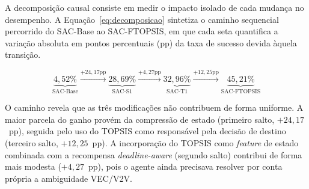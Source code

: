\begin{table}[htb]
\centering
\caption{Resultados das variantes do estudo de ablação avaliadas em 658 cenários de teste. A linha da proposta completa (\gls{SAC}-FTOPSIS) encontra-se separada das demais variantes.}
\label{tab:ablacao-resultados}
\end{table}

A decomposição causal consiste em medir o impacto isolado de cada mudança no desempenho. A Equação~\ref{eq:decomposicao} sintetiza o caminho sequencial percorrido do \gls{SAC}-Base ao \gls{SAC}-FTOPSIS, em que cada seta quantifica a variação absoluta em pontos percentuais (pp) da taxa de sucesso devida àquela transição.

\begin{equation}
    \underbrace{4{,}52\%}_{\text{SAC-Base}}
    \xrightarrow{+24{,}17\text{pp}}
    \underbrace{28{,}69\%}_{\text{SAC-S1}}
    \xrightarrow{+4{,}27\text{pp}}
    \underbrace{32{,}96\%}_{\text{SAC-T1}}
    \xrightarrow{+12{,}25\text{pp}}
    \underbrace{45{,}21\%}_{\text{SAC-FTOPSIS}}
    \label{eq:decomposicao}
\end{equation}

O caminho revela que as três modificações não contribuem de forma uniforme. A maior parcela do ganho provém da compressão de estado (primeiro salto, $+24{,}17$~pp), seguida pelo uso do \gls{TOPSIS} como responsável pela decisão de destino (terceiro salto, $+12{,}25$~pp). A incorporação do \gls{TOPSIS} como \textit{feature} de estado combinada com a recompensa \textit{deadline-aware} (segundo salto) contribui de forma mais modesta ($+4{,}27$~pp), pois o agente ainda precisava resolver por conta própria a ambiguidade \gls{VEC}/\gls{V2V}. 

